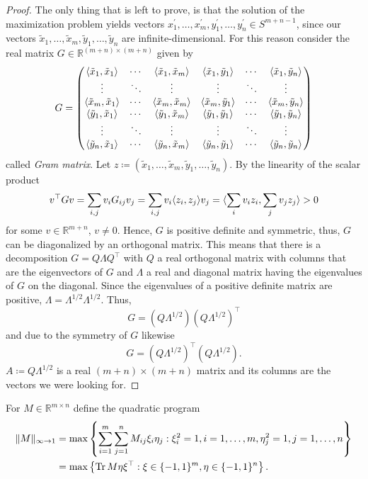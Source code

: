 \begin{proof}
		The only thing that is left to prove, is that the solution of the maximization problem yields vectors $x_1^\prime,\dots,x_m^\prime, y_1^\prime,\dots,y_n^\prime\in S^{m+n-1}$, since our vectors $\tilde{x}_1,\dots,\tilde{x}_m,\tilde{y}_1,\dots,\tilde{y}_n$ are infinite-dimensional. 
		For this reason consider the real matrix $G\in\mathbb{R}^{(m+n)\times(m+n)}$ given by
		\begin{equation}
			G=\begin{pmatrix}
				\langle{\tilde{x}_1},{\tilde{x}_1}\rangle & \cdots & \langle{\tilde{x}_1},{\tilde{x}_m}\rangle& \langle{\tilde{x}_1},{\tilde{y}_1}\rangle & \cdots & \langle{\tilde{x}_1},{\tilde{y}_n}\rangle \\
				 \vdots		& \ddots	& \vdots & \vdots & \ddots & \vdots\\
				 \langle{\tilde{x}_m},{\tilde{x}_1}\rangle & \cdots & \langle{\tilde{x}_m},{\tilde{x}_m}\rangle& \langle{\tilde{x}_m},{\tilde{y}_1}\rangle & \cdots & \langle{\tilde{x}_m},{\tilde{y}_n}\rangle \\
				\langle{\tilde{y}_1},{\tilde{x}_1}\rangle & \cdots & \langle{\tilde{y}_1},{\tilde{x}_m}\rangle& \langle{\tilde{y}_1},{\tilde{y}_1}\rangle & \cdots & \langle{\tilde{y}_1},{\tilde{y}_n}\rangle \\
				 \vdots		& \ddots	& \vdots& \vdots & \ddots & \vdots\\
				 \langle{\tilde{y}_n},{\tilde{x}_1}\rangle & \cdots & \langle{\tilde{y}_n},{\tilde{x}_m}\rangle& \langle{\tilde{y}_n},{\tilde{y}_1}\rangle & \cdots & \langle{\tilde{y}_n},{\tilde{y}_n}\rangle 
			\end{pmatrix}
		\end{equation}
		called \emph{Gram matrix}. Let $z\coloneqq (\tilde{x}_1,\dots,\tilde{x}_m,\tilde{y}_1,\dots,\tilde{y}_n)$. By the linearity of the scalar product
		\begin{align*}
			v^\top G v = \sum_{i,j} v_i G_{ij} v_j 
			= \sum_{i,j} v_i \langle{z_i},{z_j}\rangle v_j 
			= \langle{\sum_i v_i z_i},{\sum_j v_j z_j}\rangle 
			> 0
		\end{align*}
		for some $v\in\mathbb{R}^{m+n}$, $v\neq 0$. Hence, $G$ is positive definite and symmetric, thus, $G$ can be diagonalized by an orthogonal matrix. This means that there is a decomposition $G=Q\Lambda Q^\top$ with $Q$ a real orthogonal matrix with columns that are the eigenvectors of $G$ and $\Lambda$ a real and diagonal matrix having the eigenvalues of $G$ on the diagonal. Since the eigenvalues of a positive definite matrix are positive, $\Lambda=\Lambda^{1/2}\Lambda^{1/2}$. Thus,
		\[
			G=(Q\Lambda^{1/2})(Q\Lambda^{1/2})^\top		
		\]
		and due to the symmetry of $G$ likewise
		\[
			G=(Q\Lambda^{1/2})^\top(Q\Lambda^{1/2}).	
		\]
		$A\coloneqq Q\Lambda^{1/2}$ is a real $(m+n)\times (m+n)$ matrix and its columns are the vectors we were looking for.
	\end{proof}
	\begin{dfn}
		For $M\in\mathbb{R}^{m\times n}$ define the quadratic program
		\begin{align}
			 \Vert {M} \Vert_{\infty\to 1} &= \max \left\{ \sum_{i=1}^m \sum_{j=1}^n M_{ij} \xi_i \eta_j : \xi_i^2=1, i=1,\dots,m, \eta_j^2=1, j =1,\dots,n \right\} \nonumber\\ 
			&=\max\left\{\textup{Tr} \, {M \eta\xi^\top } : \xi\in\{-1,1\}^m,\eta\in\{-1,1\}^n\right\}.
		\end{align}
	\end{dfn}
	
